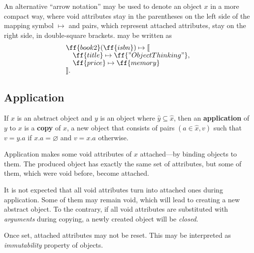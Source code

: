 An alternative ``arrow notation'' may be used to denote an object \(x\) in a more
compact way, where void attributes stay in the parentheses on the left side of the
mapping symbol \(\mapsto\) and pairs,
which represent attached attributes, stay on the right side, in double-square brackets.
 may be written as
\begin{equation}\label{eq:book2-compact}
\begin{split}
& \ff{book2}(\ff{isbn}) \mapsto \llbracket \br
& \quad \ff{title} \mapsto \ff{"Object Thinking"}, \br
& \quad \ff{price} \mapsto \ff{memory} \br
& \rrbracket. \\
\end{split}
\end{equation}

\subsection{Application}

\begin{definition}\label{def:application}
If \(x\) is an abstract object and \(y\) is an object
  where \(\hat{y}\subseteq\hat{x}\),
  then an \textbf{application} of \(y\) to \(x\) is
  a \textbf{copy} of \(x\), a new object that consists of pairs \((a\in\hat{x},v)\) such that
  \(v=y.a\) if \(x.a=\varnothing\) and \(v=x.a\) otherwise.
\end{definition}

Application makes some void attributes of \(x\) attached---by binding objects to them.
The produced object has exactly the same set of attributes, but some of them,
which were void before, become attached.

It is not expected that all void attributes turn into attached ones during application.
Some of them may remain void, which will lead
to creating a new abstract object. To the contrary,
if all void attributes are substituted with \emph{arguments} during copying,
a newly created object will be \emph{closed}.

Once set, attached attributes may not be reset.
This may be interpreted as \emph{immutability} property of objects.

